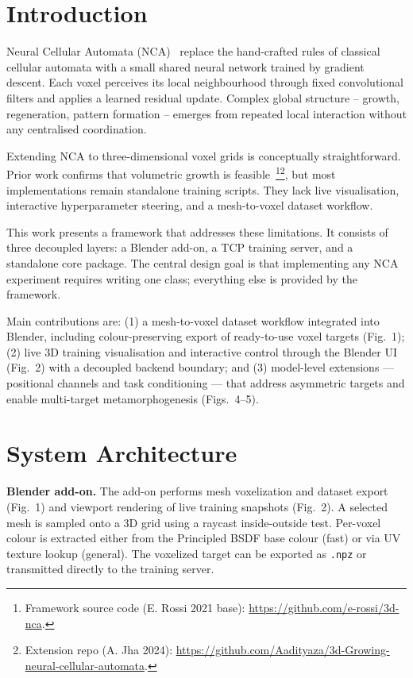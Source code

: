 \documentclass{ExcelAtFIT}
\affiliation{*%
  \href{mailto:xrepcim00@stud.fit.vutbr.cz}{xrepcim00@stud.fit.vutbr.cz},
  \textit{Faculty of Information Technology, Brno University of Technology}}
\begin{document}
\startdocument

\section{Introduction}

Neural Cellular Automata (NCA)~\cite{Mordvintsev2020} replace the hand-crafted rules
of classical cellular automata with a small shared neural network trained by gradient
descent. Each voxel perceives its local neighbourhood through fixed convolutional
filters and applies a learned residual update. Complex global structure -- growth,
regeneration, pattern formation -- emerges from repeated local interaction without
any centralised coordination.

Extending NCA to three-dimensional voxel grids is conceptually straightforward.
Prior work confirms that volumetric growth is feasible~\cite{Sudhakaran2021}\footnote{Framework source code (E. Rossi 2021 base): \url{https://github.com/e-rossi/3d-nca}.}\footnote{Extension repo (A. Jha 2024): \url{https://github.com/Aadityaza/3d-Growing-neural-cellular-automata}.}, but most implementations remain standalone training scripts.
They lack live visualisation, interactive hyperparameter steering, and a mesh-to-voxel dataset workflow.

This work presents a framework that addresses these limitations. It consists of three
decoupled layers: a Blender add-on, a TCP training server, and a standalone core
package. The central design goal is that implementing any NCA experiment requires
writing one class; everything else is provided by the framework.

Main contributions are: (1) a mesh-to-voxel dataset workflow integrated into Blender, including colour-preserving
export of ready-to-use voxel targets (Fig.~1); (2) live 3D training visualisation and interactive control through
the Blender UI (Fig.~2) with a decoupled backend boundary; and (3) model-level extensions --- positional channels and
task conditioning --- that address asymmetric targets and enable multi-target metamorphogenesis (Figs.~4--5).

\section{System Architecture}

\textbf{Blender add-on.}
The add-on performs mesh voxelization and dataset export (Fig.~1) and viewport rendering of live training snapshots
(Fig.~2). A selected mesh is sampled onto a
3D grid using a raycast inside-outside test. Per-voxel colour is extracted either from the Principled BSDF
base colour (fast) or via UV texture lookup (general). The voxelized target can be exported as \texttt{.npz}
or transmitted directly to the training server.
\end{document}
